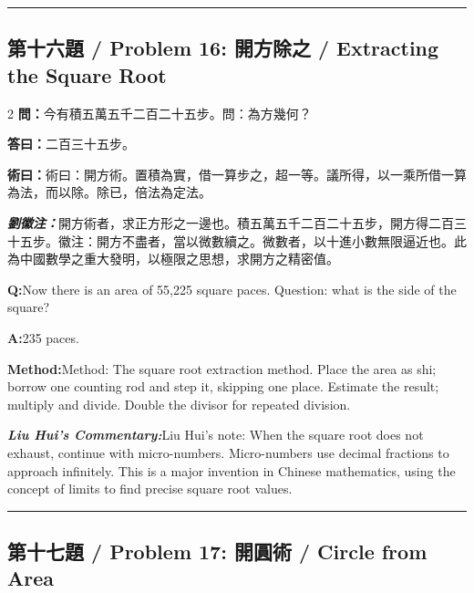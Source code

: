 \documentclass[11pt,a4paper]{article}
\newcommand{\cnwen}{\textcolor{cnlabelfg}{\textbf{問：}}}
\newcommand{\cnda}{\textbf{答曰：}}
\newcommand{\cnshu}{\textcolor{cnlabelfg}{\textbf{術曰：}}}
\newcommand{\cnzhu}{\textcolor{commentarycolor}{\textit{\textbf{劉徽注：}}}}
\newcommand{\enwen}{\textcolor{enlabelfg}{\textbf{Q:}}}
\newcommand{\enda}{\textcolor{enlabelfg}{\textbf{A:}}}
\newcommand{\enshu}{\textcolor{enlabelfg}{\textbf{Method:}}}
\newcommand{\enzhu}{\textcolor{enlabelfg}{\textit{\textbf{Liu Hui's Commentary:}}}}
\begin{document}
\bigskip\hrule\bigskip

\subsection{第十六題 / Problem 16: 開方除之 / Extracting the Square Root}

\begin{paracol}{2}
\switchcolumn[0]
\cnwen 今有積五萬五千二百二十五步。問：為方幾何？

\cnda 二百三十五步。

\cnshu 術曰：開方術。置積為實，借一算步之，超一等。議所得，以一乘所借一算為法，而以除。除已，倍法為定法。

\cnzhu 開方術者，求正方形之一邊也。積五萬五千二百二十五步，開方得二百三十五步。徽注：開方不盡者，當以微數續之。微數者，以十進小數無限逼近也。此為中國數學之重大發明，以極限之思想，求開方之精密值。

\switchcolumn[1]
\enwen Now there is an area of 55,225 square paces. Question: what is the side of the square?

\enda 235 paces.

\enshu Method: The square root extraction method. Place the area as shi; borrow one counting rod and step it, skipping one place. Estimate the result; multiply and divide. Double the divisor for repeated division.

\enzhu Liu Hui's note: When the square root does not exhaust, continue with micro-numbers. Micro-numbers use decimal fractions to approach infinitely. This is a major invention in Chinese mathematics, using the concept of limits to find precise square root values.
\end{paracol}

\bigskip\hrule\bigskip

\subsection{第十七題 / Problem 17: 開圓術 / Circle from Area}
\end{document}
